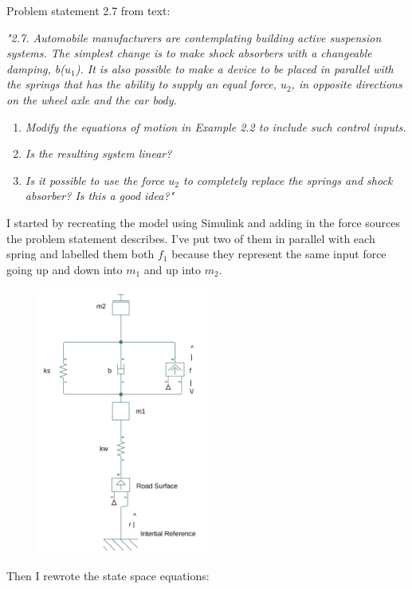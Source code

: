 \documentclass{article}
\begin{document}
Problem statement 2.7 from text:

\textit{
    "2.7. Automobile manufacturers are contemplating building active suspension systems. The simplest change is to make shock absorbers with a changeable damping, 
    b($u_1$). It is also possible to make a device to be placed in parallel with the springs that has the ability to supply an equal force, 
    $u_2$, in opposite directions on the wheel axle and the car body.
}
\begin{enumerate}[label=\alph*)]
    \item \textit{Modify the equations of motion in Example 2.2 to include such control inputs.}
    \item \textit{Is the resulting system linear?}
    \item \textit{Is it possible to use the force $u_2$ to completely replace the springs and shock absorber? Is this a good idea?"}
\end{enumerate}

I started by recreating the model using Simulink and adding in the force sources the problem statement describes.
I've put two of them in parallel with each spring and labelled them both $f_1$ because they represent the same input force going up and down into $m_1$ and up into $m_2$.

\begin{figure}[H]
    \centering
    \includegraphics[width=0.5\textwidth]{activeSusModel.png}
\end{figure}

Then I rewrote the state space equations:
\end{document}
